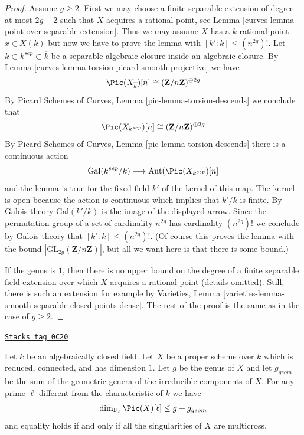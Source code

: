 \begin{proof}

Assume $g \geq 2$. First we may choose a finite separable extension
of degree at most $2g - 2$ such that $X$ acquires a rational point, see
Lemma \ref{curves-lemma-point-over-separable-extension}.
Thus we may assume $X$ has a $k$-rational point $x \in X(k)$
but now we have to prove the lemma with
$[k' : k] \leq (n^{2g})!$.
Let $k \subset k^{sep} \subset \overline{k}$ be a separable algebraic
closure inside an algebraic closure.
By Lemma \ref{curves-lemma-torsion-picard-smooth-projective} we have
$$
\Pic(X_{\overline{k}})[n] \cong (\mathbf{Z}/n\mathbf{Z})^{\oplus 2g}
$$
By Picard Schemes of Curves, Lemma \ref{pic-lemma-torsion-descends}
we conclude that
$$
\Pic(X_{k^{sep}})[n] \cong (\mathbf{Z}/n\mathbf{Z})^{\oplus 2g}
$$
By Picard Schemes of Curves, Lemma \ref{pic-lemma-torsion-descends}
there is a continuous action
$$
\text{Gal}(k^{sep}/k)
\longrightarrow
\text{Aut}(\Pic(X_{k^{sep}})[n]
$$
and the lemma is true for the fixed field $k'$ of the kernel of this map.
The kernel is open because the action is continuous which implies
that $k'/k$ is finite. By Galois theory $\text{Gal}(k'/k)$
is the image of the displayed arrow. Since the permutation
group of a set of cardinality $n^{2g}$ has cardinality $(n^{2g})!$
we conclude by Galois theory that $[k' : k] \leq (n^{2g})!$.
(Of course this proves the lemma with the bound
$|\text{GL}_{2g}(\mathbf{Z}/n\mathbf{Z})|$, but all we want
here is that there is some bound.)

\medskip\noindent
If the genus is $1$, then there is no upper bound on the degree of a
finite separable field extension over which $X$ acquires a rational point
(details omitted). Still, there is such an extension for example by
Varieties, Lemma \ref{varieties-lemma-smooth-separable-closed-points-dense}.
The rest of the proof is the same as in the case of $g \geq 2$.
\end{proof}

\begin{proposition}
\label{curves-proposition-torsion-picard-reduced-proper}
\href{https://stacks.math.columbia.edu/tag/0C20}{\texttt{Stacks tag 0C20}}

Let $k$ be an algebraically closed field. Let $X$ be a proper scheme over $k$
which is reduced, connected, and has dimension $1$. Let $g$ be the genus
of $X$ and let $g_{geom}$ be the sum of the geometric genera of the
irreducible components of $X$. For any prime $\ell$ different from
the characteristic of $k$ we have
$$
\dim_{\mathbf{F}_\ell} \Pic(X)[\ell]
\leq g + g_{geom}
$$
and equality holds if and only if all the singularities of $X$
are multicross.
\end{proposition}

